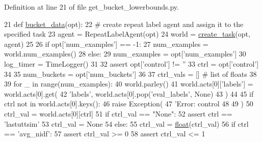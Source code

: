 Definition at line 21 of file get\+\_\+bucket\+\_\+lowerbounds.\+py.


\begin{DoxyCode}
21 \textcolor{keyword}{def }\hyperlink{namespaceprojects_1_1controllable__dialogue_1_1get__bucket__lowerbounds_aeba9a3a9932797d722c5ff9d0991a87e}{bucket\_data}(opt):
22     \textcolor{comment}{# create repeat label agent and assign it to the specified task}
23     agent = RepeatLabelAgent(opt)
24     world = \hyperlink{namespaceparlai_1_1core_1_1worlds_a11923c10b545c7ecc1b08fe2242d9c2c}{create\_task}(opt, agent)
25 
26     \textcolor{keywordflow}{if} opt[\textcolor{stringliteral}{'num\_examples'}] == -1:
27         num\_examples = world.num\_examples()
28     \textcolor{keywordflow}{else}:
29         num\_examples = opt[\textcolor{stringliteral}{'num\_examples'}]
30     log\_timer = TimeLogger()
31 
32     \textcolor{keyword}{assert} opt[\textcolor{stringliteral}{'control'}] != \textcolor{stringliteral}{''}
33     ctrl = opt[\textcolor{stringliteral}{'control'}]
34 
35     num\_buckets = opt[\textcolor{stringliteral}{'num\_buckets'}]
36 
37     ctrl\_vals = []  \textcolor{comment}{# list of floats}
38 
39     \textcolor{keywordflow}{for} \_ \textcolor{keywordflow}{in} range(num\_examples):
40         world.parley()
41         world.acts[0][\textcolor{stringliteral}{'labels'}] = world.acts[0].get(
42             \textcolor{stringliteral}{'labels'}, world.acts[0].pop(\textcolor{stringliteral}{'eval\_labels'}, \textcolor{keywordtype}{None})
43         )
44 
45         \textcolor{keywordflow}{if} ctrl \textcolor{keywordflow}{not} \textcolor{keywordflow}{in} world.acts[0].keys():
46             \textcolor{keywordflow}{raise} Exception(
47                 \textcolor{stringliteral}{'Error: control %
48                 %
49             )
50         ctrl\_val = world.acts[0][ctrl]
51         \textcolor{keywordflow}{if} ctrl\_val == \textcolor{stringliteral}{"None"}:
52             \textcolor{keyword}{assert} ctrl == \textcolor{stringliteral}{'lastuttsim'}
53             ctrl\_val = \textcolor{keywordtype}{None}
54         \textcolor{keywordflow}{else}:
55             ctrl\_val = \hyperlink{namespaceprojects_1_1controllable__dialogue_1_1make__control__dataset_aa2b7207688c641dbc094ab44eca27113}{float}(ctrl\_val)
56         \textcolor{keywordflow}{if} ctrl == \textcolor{stringliteral}{'avg\_nidf'}:
57             \textcolor{keyword}{assert} ctrl\_val >= 0
58             \textcolor{keyword}{assert} ctrl\_val <= 1
}
\end{DoxyCode}
